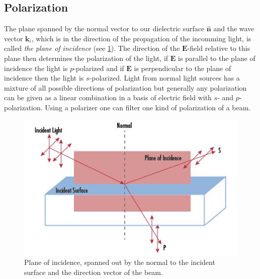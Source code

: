 \subsection{Polarization}
The plane spanned by the normal vector to our dielectric surface $\hat{\textbf{n}}$ and the wave vector $\textbf{k}_i$, which is in the direction of the propagation of the incomming light, is called \textit{the plane of incidence} (see \cref{fig:plane}). The direction of the $\textbf{E}$-field relative to this plane then determines the polarization of the light, if $\textbf{E}$ is parallel to the plane of incidence the light is $p$-polarized and if $\textbf{E}$ is perpendicular to the plane of incidence then the light is $s$-polarized. 
%
\noindent
Light from normal light sources has a mixture of all possible directions of polarization but generally any polarization can be given as a linear combination in a basis of electric field with $s$- and $p$-polarization. Using a polarizer one can filter one kind of polarization of a beam.
\begin{figure}[h]
    \centering
    \includegraphics[width=\columnwidth]{plane}
    \caption{Plane of incidence, spanned out by the normal to the incident surface and the direction vector of the beam.}
    \label{fig:plane}
\end{figure}

